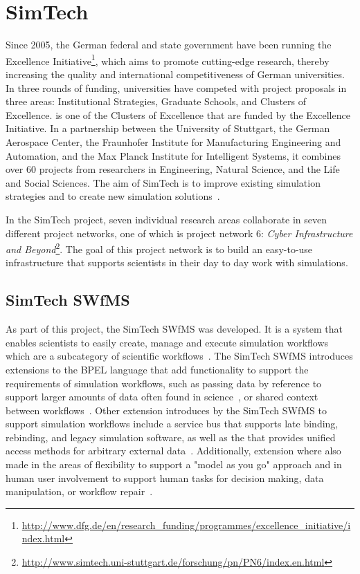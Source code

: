 \section{SimTech}
\label{fundamentals:simtech}

Since 2005, the German federal and state government have been running the Excellence Initiative\footnote{\url{http://www.dfg.de/en/research_funding/programmes/excellence_initiative/index.html}}, which aims to promote cutting-edge research, thereby increasing the quality and international competitiveness of German universities.
In three rounds of funding, universities have competed with project proposals in three areas: Institutional Strategies, Graduate Schools, and Clusters of Excellence.
 is one of the Clusters of Excellence that are funded by the Excellence Initiative.
In a partnership between the University of Stuttgart, the German Aerospace Center, the Fraunhofer Institute for Manufacturing Engineering and Automation, and the Max Planck Institute for Intelligent Systems, it combines over 60 projects from researchers in Engineering, Natural Science, and the Life and Social Sciences.
The aim of SimTech is to improve existing simulation strategies and to create new simulation solutions~\autocite{excellence:glance}.

In the SimTech project, seven individual research areas collaborate in seven different project networks, one of which is project network 6: \textit{Cyber Infrastructure and Beyond}\footnote{\url{http://www.simtech.uni-stuttgart.de/forschung/pn/PN6/index.en.html}}.
The goal of this project network is to build an easy-to-use infrastructure that supports scientists in their day to day work with simulations.

\subsection{SimTech SWfMS}

As part of this project, the SimTech SWfMS was developed.
It is a system that enables scientists to easily create, manage and execute simulation workflows which are a subcategory of scientific workflows~\autocite{workflow:simulation:flexibility}.
The SimTech SWfMS introduces extensions to the BPEL language that add functionality to support the requirements of simulation workflows, such as passing data by reference to support larger amounts of data often found in science~\autocite[also~see][]{workflow:simulation:modelling:datareferences}, or shared context between workflows~\autocite{workflow:simulation:modelling}.
Other extension introduces by the SimTech SWfMS to support simulation workflows include a service bus that supports late binding, rebinding, and legacy simulation software, as well as the  that provides unified access methods for arbitrary external data~\autocite{workflow:simulation:runtime}.
Additionally, extension where also made in the areas of flexibility to support a "model as you go" approach and in human user involvement to support human tasks for decision making, data manipulation, or workflow repair~\autocites{workflow:simulation:flexibility}{workflow:simulation:humanusers}.

